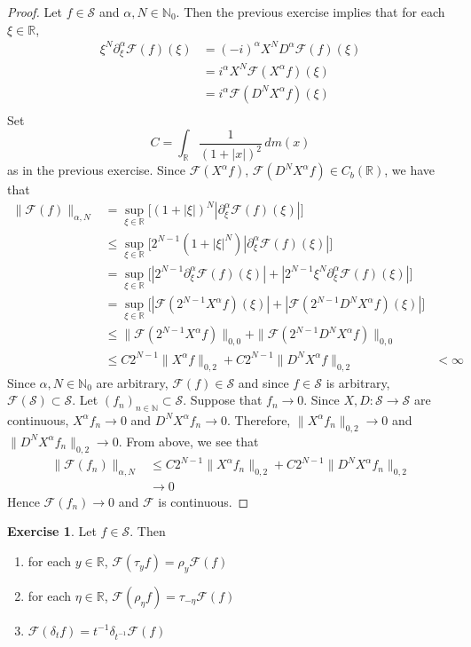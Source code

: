 \documentclass[12pt]{amsart}
\theoremstyle{definition}
\newtheorem{ex}[definition]{Exercise}
\newcommand{\p}{\partial}
\newcommand{\al}{\alpha}
\newcommand{\del}{\delta}
\newcommand{\N}{\mathbb{N}}
\newcommand{\R}{\mathbb{R}}
\newcommand{\MF}{\mathcal{F}}
\newcommand{\MS}{\mathcal{S}}
\newcommand{\dm}{\, d m}
\begin{document}
	\begin{proof}
		Let $f \in \MS$ and $\al, N \in \N_0$. Then the previous exercise implies that for each $\xi \in \R$,
		\begin{align*}
			\xi^{N}\p_{\xi}^{\al} \MF(f)(\xi)
			& =  (-i)^{\al} X^{N} D^{\al} \MF(f)(\xi) \\
			&= i^{\al} X^N \MF(X^{\al} f)(\xi) \\
			&= i^{\al} \MF(D^{N} X^{\al} f)(\xi) \\ 
		\end{align*}
		Set 
		$$C = \int_{\R} \frac{1}{(1+|x|)^2} \dm(x)$$ 
		as in the previous exercise. Since $\MF(X^{\al}f)$, $\MF(D^NX^{\al}f) \in C_b(\R)$, we have that
		\begin{align*}
			\|\MF(f)\|_{\al, N}
			& = \sup_{\xi \in \R} \bigg[ (1 + |\xi|)^N |\p_{\xi}^{\al} \MF(f)(\xi)|\bigg] \\
			& \leq \sup_{\xi \in \R} \bigg[ 2^{N-1}(1 + |\xi|^N) |\p_{\xi}^{\al} \MF(f)(\xi)| \bigg] \\
			& = \sup_{\xi \in \R} \bigg[ |2^{N-1} \p_{\xi}^{\al} \MF(f)(\xi)| + |2^{N-1}\xi^N \p_{\xi}^{\al} \MF(f)(\xi)| \bigg] \\
			& = \sup_{\xi \in \R} \bigg[  |\MF( 2^{N-1} X^{\al} f)(\xi)| + |\MF(2^{N-1} D^N X^{\al} f)(\xi)| \bigg] \\
			& \leq  \| \MF( 2^{N-1} X^{\al} f) \|_{0,0} + \| \MF(2^{N-1} D^N X^{\al} f)\|_{0,0} \\
			& \leq C2^{N-1}\| X^{\al} f \|_{0,2} +  C2^{N-1}\|  D^N X^{\al} f\|_{0,2}
			& < \infty
		\end{align*}
		Since $\al, N \in \N_0$ are arbitrary, $\MF(f) \in \MS$ and since $f \in \MS$ is arbitrary, $\MF(\MS) \subset \MS$. Let $(f_n)_{n \in \N} \subset \MS$. Suppose that $f_n \rightarrow 0$. Since $X,D: \MS \rightarrow \MS$ are continuous, $X^{\al}f_n \rightarrow 0$ and $D^NX^\al f_n \rightarrow 0$. Therefore, $\|X^{\al}f_n\|_{0, 2} \rightarrow 0$ and $\|D^NX^{\al}f_n\|_{0, 2} \rightarrow 0$. From above, we see that 
		\begin{align*}
			\|\MF(f_n)\|_{\al, N} 
			& \leq C2^{N-1}\| X^{\al} f_n \|_{0,2} +  C2^{N-1}\|  D^N X^{\al} f_n \|_{0,2} \\
			& \rightarrow 0
		\end{align*}
		Hence $\MF(f_n) \rightarrow 0$ and $\MF$ is continuous. 
	\end{proof}

	\begin{ex}
		Let $f \in \MS$. Then 
		\begin{enumerate}
			\item for each $y \in \R$, $\MF(\tau_yf) = \rho_{y} \MF(f)$ 
			\item for each $\eta \in \R$, $\MF(\rho_{\eta} f) = \tau_{-\eta} \MF(f)$
			\item $\MF(\del_t f) = t^{-1} \del_{t^{-1}} \MF(f)$
		\end{enumerate}
	\end{ex}
\end{document}
